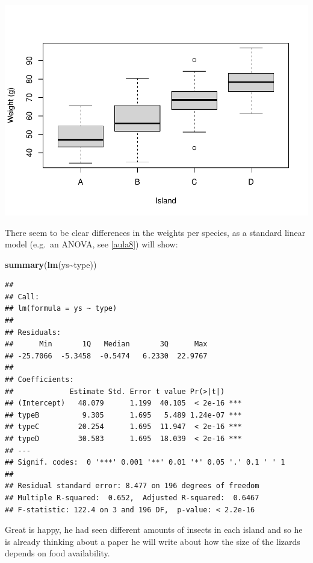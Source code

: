 \documentclass[
]{book}
\newenvironment{Shaded}{\begin{snugshade}}{\end{snugshade}}
\newcommand{\FunctionTok}[1]{\textcolor[rgb]{0.13,0.29,0.53}{\textbf{#1}}}
\newcommand{\NormalTok}[1]{#1}
\newcommand{\SpecialCharTok}[1]{\textcolor[rgb]{0.81,0.36,0.00}{\textbf{#1}}}
\begin{document}
\includegraphics{ECOMODbook_files/figure-latex/a10.3-1.pdf}

There seem to be clear differences in the weights per species, as a standard linear model (e.g.~an ANOVA, see \ref{aula8}) will show:

\begin{Shaded}
\begin{Highlighting}[]
\FunctionTok{summary}\NormalTok{(}\FunctionTok{lm}\NormalTok{(ys}\SpecialCharTok{\textasciitilde{}}\NormalTok{type))}
\end{Highlighting}
\end{Shaded}

\begin{verbatim}
## 
## Call:
## lm(formula = ys ~ type)
## 
## Residuals:
##      Min       1Q   Median       3Q      Max 
## -25.7066  -5.3458  -0.5474   6.2330  22.9767 
## 
## Coefficients:
##             Estimate Std. Error t value Pr(>|t|)    
## (Intercept)   48.079      1.199  40.105  < 2e-16 ***
## typeB          9.305      1.695   5.489 1.24e-07 ***
## typeC         20.254      1.695  11.947  < 2e-16 ***
## typeD         30.583      1.695  18.039  < 2e-16 ***
## ---
## Signif. codes:  0 '***' 0.001 '**' 0.01 '*' 0.05 '.' 0.1 ' ' 1
## 
## Residual standard error: 8.477 on 196 degrees of freedom
## Multiple R-squared:  0.652,  Adjusted R-squared:  0.6467 
## F-statistic: 122.4 on 3 and 196 DF,  p-value: < 2.2e-16
\end{verbatim}

Great is happy, he had seen different amounts of insects in each island and so he is already thinking about a paper he will write about how the size of the lizards depends on food availability.
\end{document}
